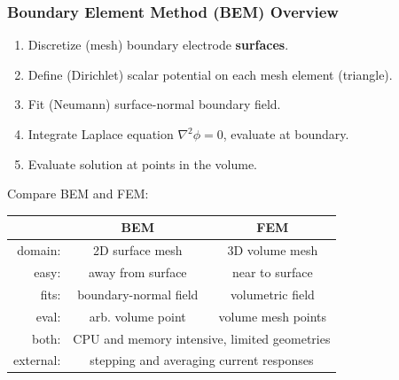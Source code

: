\documentclass[xcolor=dvipsnames]{beamer}
\begin{document}


\begin{frame}[fragile]
  \frametitle{Boundary Element Method (BEM) Overview}
  \begin{enumerate}  \footnotesize
  \item Discretize (mesh) boundary electrode \textbf{surfaces}.
  \item Define (Dirichlet) scalar potential on each mesh element (triangle).
  \item Fit (Neumann) surface-normal boundary field.
  \item Integrate Laplace equation $\nabla^2\phi=0$, evaluate at boundary.
  \item Evaluate solution at points in the volume.
  \end{enumerate}

  \vfill

  \footnotesize

  Compare BEM and FEM:

  \begin{center}

    \begin{tabular}[h]{rcc}
      & BEM & FEM \\
      \hline
      domain: & 2D surface mesh & 3D volume mesh \\
      easy: & away from surface & near to surface \\
      fits: & boundary-normal field & volumetric field \\
      eval: & arb. volume point & volume mesh points \\
      \hline
      both: & \multicolumn{2}{c}{CPU and memory intensive, limited geometries} \\
      external: & \multicolumn{2}{c}{stepping and averaging current responses} \\
    \end{tabular}
  \end{center}

\end{frame}
\end{document}
